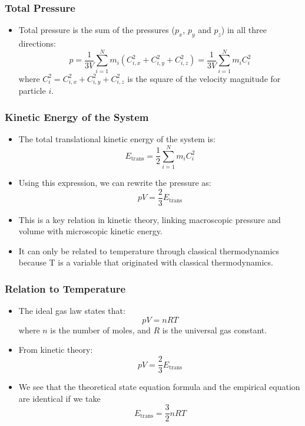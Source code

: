\documentclass{beamer}
\begin{document}
\begin{frame}
\frametitle{Total Pressure}
\begin{itemize}
    \item Total pressure is the sum of the pressures ($p_x$, $p_y$ and $p_z$) in all three directions:
    \[
    p = \frac{1}{3V} \sum_{i=1}^{N} m_i (C_{i,x}^2 + C_{i,y}^2 + C_{i,z}^2) = \frac{1}{3V} \sum_{i=1}^{N} m_i C_i^2
    \]
    where $C_i^2 = C_{i,x}^2 + C_{i,y}^2 + C_{i,z}^2$ is the square of the velocity magnitude for particle $i$.
\end{itemize}
\end{frame}

\begin{frame}
\frametitle{Kinetic Energy of the System}
\begin{itemize}
    \item The total translational kinetic energy of the system is:
    \[
    E_{\text{trans}} = \frac{1}{2} \sum_{i=1}^{N} m_i C_i^2
    \]
    \item Using this expression, we can rewrite the pressure as:
    \[
    pV = \frac{2}{3} E_{\text{trans}}
    \]
    \item This is a key relation in kinetic theory, linking macroscopic pressure and volume with microscopic kinetic energy.
    \item It can only be related to temperature through classical thermodynamics
because T is a variable that originated with classical thermodynamics.
\end{itemize}
\end{frame}

\begin{frame}
\frametitle{Relation to Temperature}
\begin{itemize}
    \item The ideal gas law states that:
    \[
    pV = nRT
    \]
    where $n$ is the number of moles, and $R$ is the universal gas constant.
    \item From kinetic theory:
    \[
    pV = \frac{2}{3} E_{\text{trans}}
    \]
    \item We see that the theoretical state equation formula and the empirical equation are identical if we take
    \[
    \boxed{E_{\text{trans}} = \frac{3}{2} nRT}
    \]
\end{itemize}
\end{frame}
\end{document}
